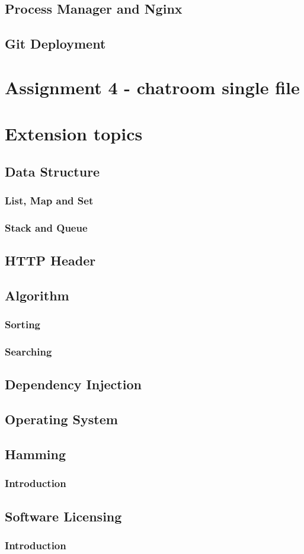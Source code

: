 \documentclass[a4paper]{article}
\begin{document}
\subsection{Process Manager and Nginx}
\subsection{Git Deployment}

\section{Assignment 4 - chatroom single file}

\section{Extension topics}

\subsection{Data Structure}
\subsubsection{List, Map and Set}
\subsubsection{Stack and Queue}

\subsection{HTTP Header}

\subsection{Algorithm}
\subsubsection{Sorting}
\subsubsection{Searching}

\subsection{Dependency Injection}

\subsection{Operating System}

\subsection{Hamming}
\subsubsection{Introduction}

\subsection{Software Licensing}
\subsubsection{Introduction}
\end{document}
